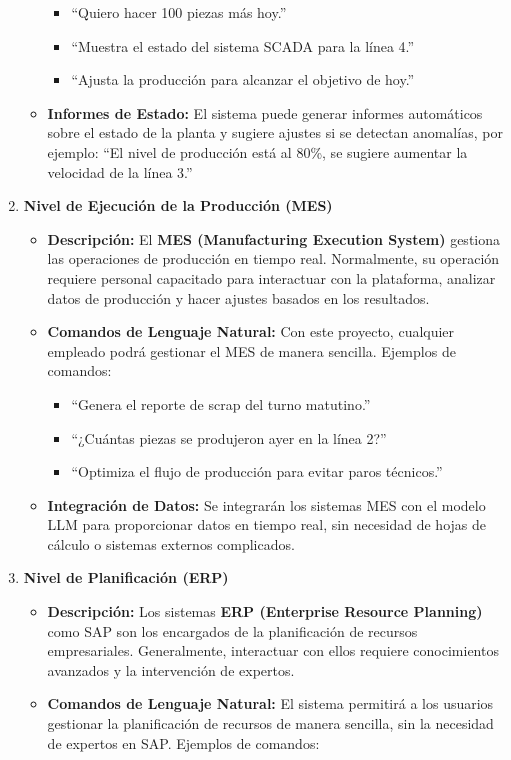 \documentclass[
  10pt,
  letterpaper,
]{book}
\providecommand{\tightlist}{%
  \setlength{\itemsep}{0pt}\setlength{\parskip}{0pt}}\usepackage{longtable,booktabs,array}
\begin{document}
\begin{enumerate}
\begin{itemize}
    \begin{itemize}
    \tightlist
    \item
      ``Quiero hacer 100 piezas más hoy.''
    \item
      ``Muestra el estado del sistema SCADA para la línea 4.''
    \item
      ``Ajusta la producción para alcanzar el objetivo de hoy.''
    \end{itemize}
  \item
    \textbf{Informes de Estado:} El sistema puede generar informes
    automáticos sobre el estado de la planta y sugiere ajustes si se
    detectan anomalías, por ejemplo: ``El nivel de producción está al
    80\%, se sugiere aumentar la velocidad de la línea 3.''
  \end{itemize}
\item
  \textbf{Nivel de Ejecución de la Producción (MES)}

  \begin{itemize}
  \item
    \textbf{Descripción:} El \textbf{MES (Manufacturing Execution
    System)} gestiona las operaciones de producción en tiempo real.
    Normalmente, su operación requiere personal capacitado para
    interactuar con la plataforma, analizar datos de producción y hacer
    ajustes basados en los resultados.
  \item
    \textbf{Comandos de Lenguaje Natural:} Con este proyecto, cualquier
    empleado podrá gestionar el MES de manera sencilla. Ejemplos de
    comandos:

    \begin{itemize}
    \tightlist
    \item
      ``Genera el reporte de scrap del turno matutino.''
    \item
      ``¿Cuántas piezas se produjeron ayer en la línea 2?''
    \item
      ``Optimiza el flujo de producción para evitar paros técnicos.''
    \end{itemize}
  \item
    \textbf{Integración de Datos:} Se integrarán los sistemas MES con el
    modelo LLM para proporcionar datos en tiempo real, sin necesidad de
    hojas de cálculo o sistemas externos complicados.
  \end{itemize}
\item
  \textbf{Nivel de Planificación (ERP)}

  \begin{itemize}
  \item
    \textbf{Descripción:} Los sistemas \textbf{ERP (Enterprise Resource
    Planning)} como SAP son los encargados de la planificación de
    recursos empresariales. Generalmente, interactuar con ellos requiere
    conocimientos avanzados y la intervención de expertos.
  \item
    \textbf{Comandos de Lenguaje Natural:} El sistema permitirá a los
    usuarios gestionar la planificación de recursos de manera sencilla,
    sin la necesidad de expertos en SAP. Ejemplos de comandos:


\end{itemize}
\end{enumerate}
\end{document}
